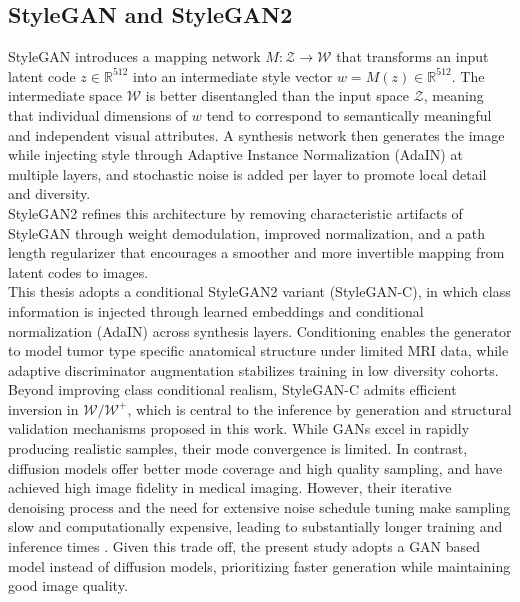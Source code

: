 \subsection{StyleGAN and StyleGAN2}

StyleGAN \cite{karras2019stylebasedgeneratorarchitecturegenerative} introduces a mapping network $M:\mathcal{Z}\rightarrow\mathcal{W}$ that transforms an input latent code $z \in \mathbb{R}^{512}$ into an intermediate style vector $w=M(z) \in \mathbb{R}^{512}$. The intermediate space $\mathcal{W}$ is better disentangled than the input space $\mathcal{Z}$, meaning that individual dimensions of $w$ tend to correspond to semantically meaningful and independent visual attributes. A synthesis network then generates the image while injecting style through Adaptive Instance Normalization (AdaIN) at multiple layers, and stochastic noise is added per layer to promote local detail and diversity.\\

StyleGAN2 \cite{Karras2019stylegan2} refines this architecture by removing characteristic artifacts of StyleGAN through weight demodulation, improved normalization, and a path length regularizer that encourages a smoother and more invertible mapping from latent codes to images.\\

This thesis adopts a conditional StyleGAN2 variant (StyleGAN-C), in which class information is injected through learned embeddings and conditional normalization (AdaIN) across synthesis layers. Conditioning enables the generator to model tumor type specific anatomical structure under limited MRI data, while adaptive discriminator augmentation stabilizes training in low diversity cohorts. Beyond improving class conditional realism, StyleGAN-C admits efficient inversion in $\mathcal{W}/\mathcal{W}^+$, which is central to the inference by generation and structural validation mechanisms proposed in this work. While GANs excel in rapidly producing realistic samples, their mode convergence is limited. In
contrast, diffusion models offer better mode coverage and high quality sampling, and have
achieved high image fidelity in medical imaging. However, their iterative denoising process and
the need for extensive noise schedule tuning make sampling slow and computationally expensive,
leading to substantially longer training and inference times \cite{abdullah2025computationallyefficientdiffusionmodels}.
Given this trade off, the present study adopts a GAN based model instead of diffusion models, prioritizing faster generation while maintaining good image quality.




